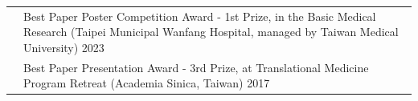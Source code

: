 \documentclass[letterpaper, 11pt]{article}
\begin{document}
\begin{longtable}{p{1.3in}p{4.8in}}


{\color{OliveGreen}{Honors and award}} 
& Best Paper Poster Competition Award - 1st Prize, in the Basic Medical Research (Taipei Municipal Wanfang Hospital, managed by Taiwan Medical University) \hfill 2023\\

& Best Paper Presentation Award - 3rd Prize, at Translational Medicine
Program Retreat (Academia Sinica, Taiwan) \hfill 2017\\




 


\end{longtable}
\end{document}
